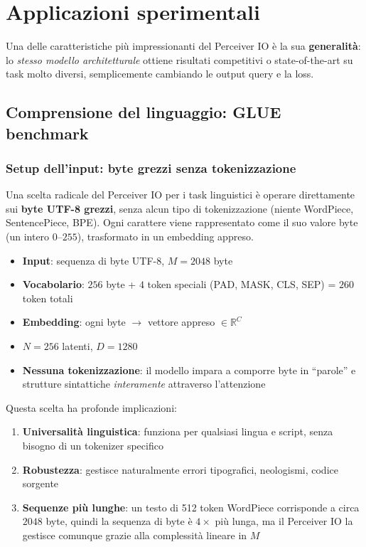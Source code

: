 \documentclass[12pt,a4paper]{article}
\begin{document}
\section{Applicazioni sperimentali}

Una delle caratteristiche pi\`u impressionanti del Perceiver IO \`e la sua \textbf{generalit\`a}: lo \emph{stesso modello architetturale} ottiene risultati competitivi o state-of-the-art su task molto diversi, semplicemente cambiando le output query e la loss.

\subsection{Comprensione del linguaggio: GLUE benchmark}

\subsubsection{Setup dell'input: byte grezzi senza tokenizzazione}

Una scelta radicale del Perceiver IO per i task linguistici \`e operare direttamente sui \textbf{byte UTF-8 grezzi}, senza alcun tipo di tokenizzazione (niente WordPiece, SentencePiece, BPE). Ogni carattere viene rappresentato come il suo valore byte (un intero $0$--$255$), trasformato in un embedding appreso.

\begin{itemize}
    \item \textbf{Input}: sequenza di byte UTF-8, $M = 2048$ byte
    \item \textbf{Vocabolario}: $256$ byte + $4$ token speciali (PAD, MASK, CLS, SEP) = $260$ token totali
    \item \textbf{Embedding}: ogni byte $\to$ vettore appreso $\in \mathbb{R}^C$
    \item $N = 256$ latenti, $D = 1280$
    \item \textbf{Nessuna tokenizzazione}: il modello impara a comporre byte in ``parole'' e strutture sintattiche \emph{interamente} attraverso l'attenzione
\end{itemize}

Questa scelta ha profonde implicazioni:
\begin{enumerate}
    \item \textbf{Universalit\`a linguistica}: funziona per qualsiasi lingua e script, senza bisogno di un tokenizer specifico
    \item \textbf{Robustezza}: gestisce naturalmente errori tipografici, neologismi, codice sorgente
    \item \textbf{Sequenze pi\`u lunghe}: un testo di 512 token WordPiece corrisponde a circa $2048$ byte, quindi la sequenza di byte \`e $4\times$ pi\`u lunga, ma il Perceiver IO la gestisce comunque grazie alla complessit\`a lineare in $M$
\end{enumerate}
\end{document}
